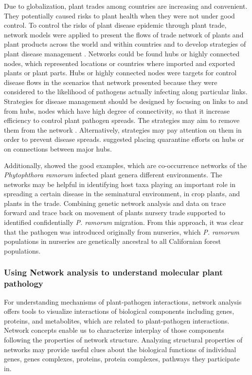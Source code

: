 \documentclass[12pt, oneside]{report}
\begin{document}
Due to globalization, plant trades among countries are increasing and convenient. They potentially caused risks to plant health when they were not under good control. To control the risks of plant disease epidemic through plant trade, network models were applied to present the flows of trade network of plants and plant products across the world and within countries and to develop strategies of plant disease management \citep{pautasso2015network}. Networks could be found hubs or highly connected nodes, which represented locations or countries where imported and exported plants or plant parts. Hubs or highly connected nodes were targets for control disease flows in the scenarios that network presented because they were considered to the likelihood of pathogens actually infecting along particular links. Strategies for disease management should be designed by focusing on links to and from hubs, nodes which have high degree of connectivity, so that it increase efficiency to control plant pathogen spreads. The strategies may aim to remove them from the network \citep{Jeger:2007tn, Lefebvre:2011fo}. Alternatively, strategies may pay attention on them in order to prevent disease spreads. \citet{Shaw:2014cka} suggested placing quarantine efforts on hubs or on connections between major hubs.

Additionally, \citet{pautasso2008epidemiological} showed the good examples, which are co-occurrence networks of the \textit{Phytophthora ramorum} infected plant genera different environments. The networks may be helpful in identifying host taxa playing an important role in spreading a certain disease in the seminatural environment, in crop plants, and plants in the trade. Combining genetic network analysis and data on trace forward and trace back on movement of plants nursery trade supported to identified confidentially \textit{P. ramorum} migration. From this approach, it was clear that the pathogen was introduced originally from nurseries, which \textit{P. ramorum} populations in nurseries are genetically ancestral to all Californian forest populations.

\subsubsection*{Using Network analysis to understand molecular plant pathology}

For understanding mechanisms of plant-pathogen interactions, network analysis offers tools to visualize interactions of biological components including genes, proteins, and metabolites, which are related to plant-pathogen interactions. Network concepts enable us to characterize interplay of those components following the properties of network structure. Analyzing structural properties of networks may provide useful clues about the biological functions of individual genes, genes complexes, proteins, protein complexes, pathways they participate in.
\end{document}

